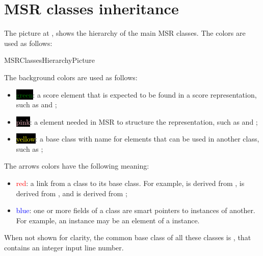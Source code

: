 \section{MSR classes inheritance}\label{MSR classes inheritance}

The picture at , shows the hierarchy of the main MSR classes. The  colors are used as follows:

{MSRClassesHierarchyPicture}

The background colors are used as follows:
\begin{itemize}
\item \colorbox{black}{\textcolor{green}{green}}: a score element that is expected to be found in a score representation, such as  and ;

\item \colorbox{black}{\textcolor{pink}{pink}}: a element needed in MSR to structure the representation, such as  and ;

\item \colorbox{black}{\textcolor{yellow}{yellow}}: a base class   with name  for elements that can be used in another class, such as ;
\end{itemize}

The arrows colors have the following meaning:
\begin{itemize}
\item \textcolor{red}{red}: a link from a class   to its base class. For example,  is derived from ,  is derived from , and  is derived from ;

\item \textcolor{blue}{blue}: one or more fields of a class   are smart pointers to instances of another. For example, an  instance may be an element of a  instance.
\end{itemize}

When not shown for clarity, the common base class   of all these classes is , that contains an integer input line number.

